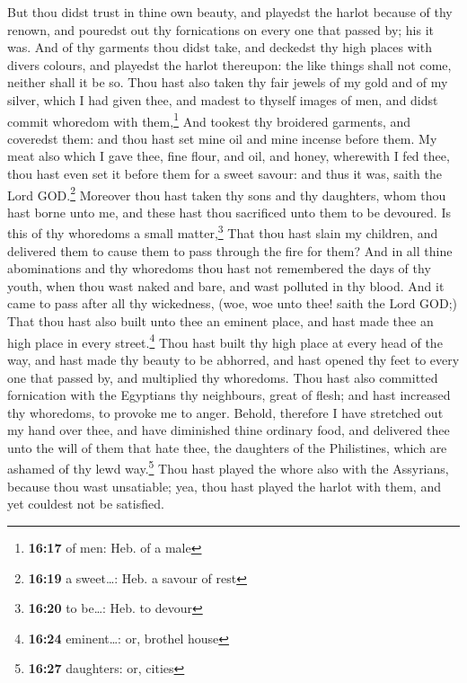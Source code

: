  But thou didst trust in thine own beauty, and playedst
the harlot because of thy renown, and pouredst out thy fornications on
every one that passed by; his it was.  And of thy
garments thou didst take, and deckedst thy high places with divers
colours, and playedst the harlot thereupon: the like things shall not
come, neither shall it be so.  Thou hast also taken thy
fair jewels of my gold and of my silver, which I had given thee, and
madest to thyself images of men, and didst commit whoredom with
them,\footnote{\textbf{16:17} of men: Heb. of a male} 
And tookest thy broidered garments, and coveredst them: and thou hast
set mine oil and mine incense before them.  My meat also
which I gave thee, fine flour, and oil, and honey, wherewith I fed thee,
thou hast even set it before them for a sweet savour: and thus it was,
saith the Lord GOD.\footnote{\textbf{16:19} a sweet\ldots: Heb. a savour
  of rest}  Moreover thou hast taken thy sons and thy
daughters, whom thou hast borne unto me, and these hast thou sacrificed
unto them to be devoured. Is this of thy whoredoms a small
matter,\footnote{\textbf{16:20} to be\ldots: Heb. to devour}
 That thou hast slain my children, and delivered them to
cause them to pass through the fire for them?  And in all
thine abominations and thy whoredoms thou hast not remembered the days
of thy youth, when thou wast naked and bare, and wast polluted in thy
blood.  And it came to pass after all thy wickedness,
(woe, woe unto thee! saith the Lord GOD;)  That thou hast
also built unto thee an eminent place, and hast made thee an high place
in every street.\footnote{\textbf{16:24} eminent\ldots: or, brothel
  house}  Thou hast built thy high place at every head of
the way, and hast made thy beauty to be abhorred, and hast opened thy
feet to every one that passed by, and multiplied thy whoredoms.
 Thou hast also committed fornication with the Egyptians
thy neighbours, great of flesh; and hast increased thy whoredoms, to
provoke me to anger.  Behold, therefore I have stretched
out my hand over thee, and have diminished thine ordinary food, and
delivered thee unto the will of them that hate thee, the daughters of
the Philistines, which are ashamed of thy lewd way.\footnote{\textbf{16:27}
  daughters: or, cities}  Thou hast played the whore also
with the Assyrians, because thou wast unsatiable; yea, thou hast played
the harlot with them, and yet couldest not be satisfied. 
